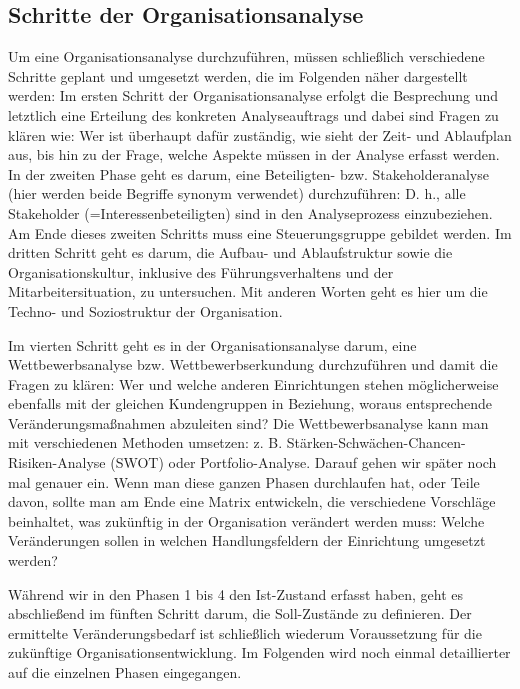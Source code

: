 \documentclass[
  letterpaper,
]{book}
\begin{document}
\subsection{Schritte der
Organisationsanalyse}\label{schritte-der-organisationsanalyse}

Um eine Organisationsanalyse durchzuführen, müssen schließlich
verschiedene Schritte geplant und umgesetzt werden, die im Folgenden
näher dargestellt werden: Im ersten Schritt der Organisationsanalyse
erfolgt die Besprechung und letztlich eine Erteilung des konkreten
Analyseauftrags und dabei sind Fragen zu klären wie: Wer ist überhaupt
dafür zuständig, wie sieht der Zeit- und Ablaufplan aus, bis hin zu der
Frage, welche Aspekte müssen in der Analyse erfasst werden. In der
zweiten Phase geht es darum, eine Beteiligten- bzw. Stakeholderanalyse
(hier werden beide Begriffe synonym verwendet) durchzuführen: D. h.,
alle Stakeholder (=Interessenbeteiligten) sind in den Analyseprozess
einzubeziehen. Am Ende dieses zweiten Schritts muss eine
Steuerungsgruppe gebildet werden. Im dritten Schritt geht es darum, die
Aufbau- und Ablaufstruktur sowie die Organisationskultur, inklusive des
Führungsverhaltens und der Mitarbeitersituation, zu untersuchen. Mit
anderen Worten geht es hier um die Techno- und Soziostruktur der
Organisation.

Im vierten Schritt geht es in der Organisationsanalyse darum, eine
Wettbewerbsanalyse bzw. Wettbewerbserkundung durchzuführen und damit die
Fragen zu klären: Wer und welche anderen Einrichtungen stehen
möglicherweise ebenfalls mit der gleichen Kundengruppen in Beziehung,
woraus entsprechende Veränderungsmaßnahmen abzuleiten sind? Die
Wettbewerbsanalyse kann man mit verschiedenen Methoden umsetzen: z. B.
Stärken-Schwächen-Chancen-Risiken-Analyse (SWOT) oder Portfolio-Analyse.
Darauf gehen wir später noch mal genauer ein. Wenn man diese ganzen
Phasen durchlaufen hat, oder Teile davon, sollte man am Ende eine Matrix
entwickeln, die verschiedene Vorschläge beinhaltet, was zukünftig in der
Organisation verändert werden muss: Welche Veränderungen sollen in
welchen Handlungsfeldern der Einrichtung umgesetzt werden?

Während wir in den Phasen 1 bis 4 den Ist-Zustand erfasst haben, geht es
abschließend im fünften Schritt darum, die Soll-Zustände zu definieren.
Der ermittelte Veränderungsbedarf ist schließlich wiederum Voraussetzung
für die zukünftige Organisationsentwicklung. Im Folgenden wird noch
einmal detaillierter auf die einzelnen Phasen eingegangen.
\end{document}
